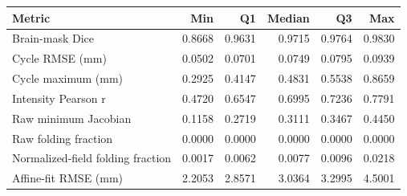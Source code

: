 \begin{tabular}{lrrrrr}
\toprule
Metric & Min & Q1 & Median & Q3 & Max \\
\midrule
Brain-mask Dice & 0.8668 & 0.9631 & 0.9715 & 0.9764 & 0.9830 \\
Cycle RMSE (mm) & 0.0502 & 0.0701 & 0.0749 & 0.0795 & 0.0939 \\
Cycle maximum (mm) & 0.2925 & 0.4147 & 0.4831 & 0.5538 & 0.8659 \\
Intensity Pearson r & 0.4720 & 0.6547 & 0.6995 & 0.7236 & 0.7791 \\
Raw minimum Jacobian & 0.1158 & 0.2719 & 0.3111 & 0.3467 & 0.4450 \\
Raw folding fraction & 0.0000 & 0.0000 & 0.0000 & 0.0000 & 0.0000 \\
Normalized-field folding fraction & 0.0017 & 0.0062 & 0.0077 & 0.0096 & 0.0218 \\
Affine-fit RMSE (mm) & 2.2053 & 2.8571 & 3.0364 & 3.2995 & 4.5001 \\
\bottomrule
\end{tabular}
